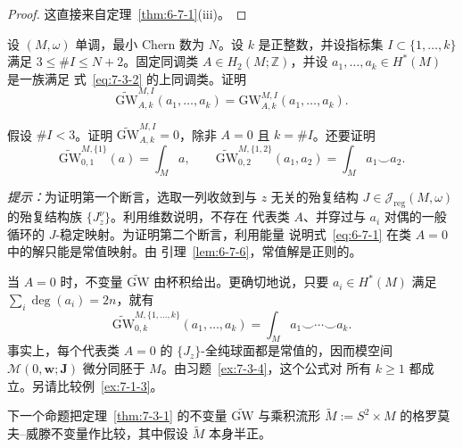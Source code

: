 \begin{proof}
这直接来自定理~\ref{thm:6-7-1}\textup{(iii)}。
\end{proof}

\begin{exercise}\label{ex:7-3-3}
设 $(M,\omega)$ 单调，最小 Chern 数为 $N$。设 $k$ 是正整数，并设指标集
$I\subset\{1,\ldots,k\}$ 满足 $3\le\#I\le N+2$。固定同调类
$A\in H_2(M;\mathbb Z)$，并设 $a_1,\ldots,a_k\in H^*(M)$ 是一族满足
式~\eqref{eq:7-3-2} 的上同调类。证明
\[
  \widetilde{\mathrm{GW}}^{M,I}_{A,k}(a_1,\ldots,a_k)
  =\mathrm{GW}^{M,I}_{A,k}(a_1,\ldots,a_k).
\]
\end{exercise}

\begin{exercise}\label{ex:7-3-4}
假设 $\#I<3$。证明 $\widetilde{\mathrm{GW}}^{M,I}_{A,k}=0$，除非 $A=0$ 且
$k=\#I$。还要证明
\[
  \widetilde{\mathrm{GW}}^{M,\{1\}}_{0,1}(a)=\int_M a,
  \qquad
  \widetilde{\mathrm{GW}}^{M,\{1,2\}}_{0,2}(a_1,a_2)
  =\int_M a_1\smile a_2.
\]

\emph{提示：}为证明第一个断言，选取一列收敛到与 $z$ 无关的殆复结构
$J\in\mathcal J_{\mathrm{reg}}(M,\omega)$ 的殆复结构族 $\{J_z^\nu\}$。利用维数说明，不存在
代表类 $A$、并穿过与 $a_i$ 对偶的一般循环的 $J$-稳定映射。为证明第二个断言，利用能量
说明式~\eqref{eq:6-7-1} 在类 $A=0$ 中的解只能是常值映射。由
引理~\ref{lem:6-7-6}，常值解是正则的。
\end{exercise}

\begin{example}[杯积]\label{ex:7-3-5}
当 $A=0$ 时，不变量 $\widetilde{\mathrm{GW}}$ 由杯积给出。更确切地说，只要
$a_i\in H^*(M)$ 满足 $\sum_i\deg(a_i)=2n$，就有
\[
  \widetilde{\mathrm{GW}}^{M,\{1,\ldots,k\}}_{0,k}(a_1,\ldots,a_k)
  =\int_M a_1\smile\cdots\smile a_k.
\]
事实上，每个代表类 $A=0$ 的 $\{J_z\}$-全纯球面都是常值的，因而模空间
$\mathcal M(0,\mathbf w;\mathbf J)$ 微分同胚于 $M$。由习题~\ref{ex:7-3-4}，这个公式对
所有 $k\ge1$ 都成立。另请比较例~\ref{ex:7-1-3}。
\end{example}

下一个命题把定理~\ref{thm:7-3-1} 的不变量 $\widetilde{\mathrm{GW}}$ 与乘积流形
$\widetilde M:=S^2\times M$ 的格罗莫夫--威滕不变量作比较，其中假设
$\widetilde M$ 本身半正。

